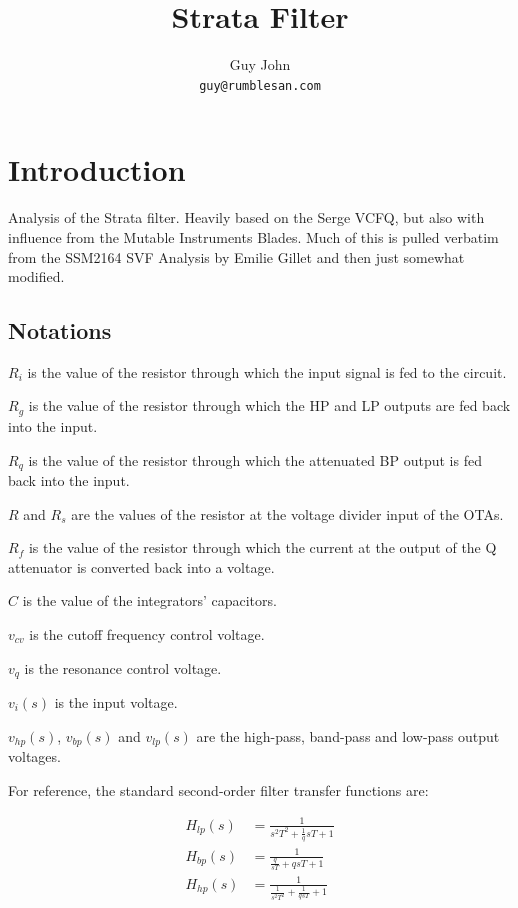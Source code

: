 \documentclass{article}
\title{Strata Filter}
\author{Guy John \\ \texttt{guy@rumblesan.com}}
\begin{document}
\maketitle

\section{Introduction}
Analysis of the Strata filter. Heavily based on the Serge VCFQ, but also with influence from the Mutable Instruments Blades. Much of this is pulled verbatim from the SSM2164 SVF Analysis by Emilie Gillet and then just somewhat modified.

\newpage

\subsection{Notations}

\begin{description}
\item $R_i$ is the value of the resistor through which the input signal is fed to the circuit.
\item $R_g$ is the value of the resistor through which the HP and LP outputs are fed back into the input.
\item $R_q$ is the value of the resistor through which the attenuated BP output is fed back into the input.
\item $R$ and $R_s$ are the values of the resistor at the voltage divider input of the OTAs.
\item $R_f$ is the value of the resistor through which the current at the output of the Q attenuator is converted back
into a voltage.
\item $C$ is the value of the integrators' capacitors.
\item $v_{cv}$ is the cutoff frequency control voltage.
\item $v_q$ is the resonance control voltage.
\item $v_i(s)$ is the input voltage.
\item $v_{hp}(s)$, $v_{bp}(s)$ and $v_{lp}(s)$ are the high-pass, band-pass and low-pass output voltages.
\end{description}

For reference, the standard second-order filter transfer functions are:

\begin{equation*}
\begin{split}
  H_{lp}(s) & = \frac{1}{s^2T^2 + \frac{1}{q}sT + 1} \\
  H_{bp}(s) & = \frac{1}{\frac{q}{sT} + qsT + 1} \\
  H_{hp}(s) & = \frac{1}{\frac{1}{s^2T^2} + \frac{1}{qsT} + 1} \\
\end{split}
\end{equation*}
\end{document}
